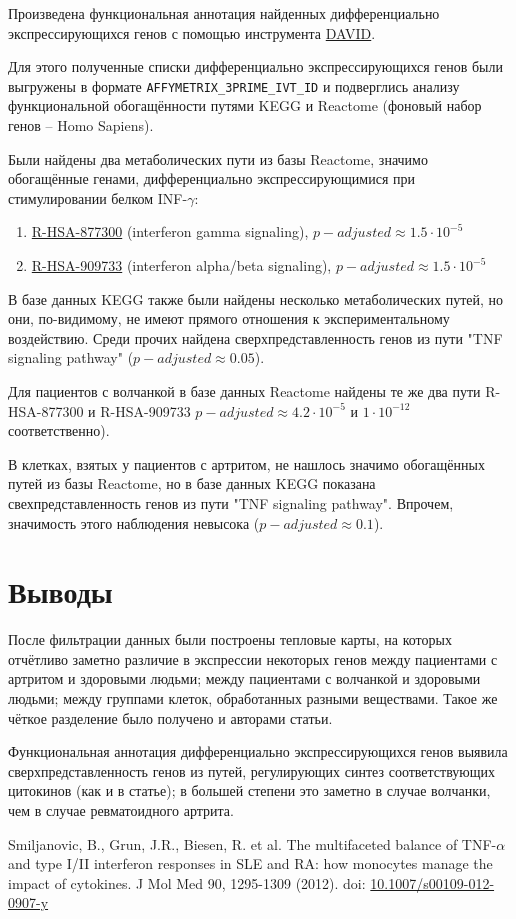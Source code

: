 \documentclass{article}
\begin{document}
Произведена функциональная аннотация найденных дифференциально экспрессирующихся генов с помощью инструмента \href{https://david.ncifcrf.gov/}{DAVID}.

Для этого полученные списки дифференциально экспрессирующихся генов были выгружены в формате \texttt{AFFYMETRIX\_\-3PRIME\_\-IVT\_\-ID}
и подверглись анализу функциональной обогащённости путями KEGG и Reactome (фоновый набор генов -- Homo Sapiens).

Были найдены два метаболических пути из базы Reactome, значимо обогащённые генами, дифференциально экспрессирующимися при стимулировании белком INF-$\gamma$:
\begin{enumerate}
    \item \href{http://www.reactome.org/content/detail/R-HSA-877300}{R-HSA-877300} (interferon gamma signaling), $p-adjusted \approx 1.5\cdot 10^{-5}$
    \item \href{http://www.reactome.org/content/detail/R-HSA-909733}{R-HSA-909733} (interferon alpha/beta signaling), $p-adjusted \approx 1.5\cdot 10^{-5}$
\end{enumerate}

В базе данных KEGG также были найдены несколько метаболических путей, но они, по-видимому, не имеют прямого отношения к экспериментальному воздействию.
Среди прочих найдена сверхпредставленность генов из пути "TNF signaling pathway"
($p-adjusted \approx 0.05$).

Для пациентов с волчанкой в базе данных Reactome найдены те же два пути R-HSA-877300 и R-HSA-909733   $p-adjusted \approx 4.2\cdot 10^{-5}$ и $1\cdot 10^{-12}$ соответственно).

В клетках, взятых у пациентов с артритом, не нашлось значимо обогащённых путей из базы Reactome, но в базе данных KEGG показана свехпредставленность генов из пути "TNF signaling pathway".
Впрочем, значимость этого наблюдения невысока ($p-adjusted \approx 0.1$).

\section{Выводы}

После фильтрации данных были построены тепловые карты, на которых отчётливо заметно  различие в экспрессии некоторых генов между пациентами с артритом и здоровыми людьми; между пациентами с волчанкой и здоровыми людьми; между группами клеток, обработанных разными веществами.
Такое же чёткое разделение было получено и авторами статьи.

Функциональная аннотация дифференциально экспрессирующихся генов выявила сверхпредставленность генов из путей, регулирующих синтез соответствующих цитокинов (как и в статье); в большей степени это заметно в случае волчанки, чем в случае ревматоидного артрита.

\begin{thebibliography}{99}
     Smiljanovic, B., Grun, J.R., Biesen, R. et al. The multifaceted balance of TNF-$\alpha$ and type I/II interferon responses in SLE and RA: how monocytes manage the impact of cytokines. J Mol Med 90, 1295-1309 (2012). doi: \href{https://doi.org/10.1007/s00109-012-0907-y}{10.1007/s00109-012-0907-y}
\end{thebibliography}
\end{document}
